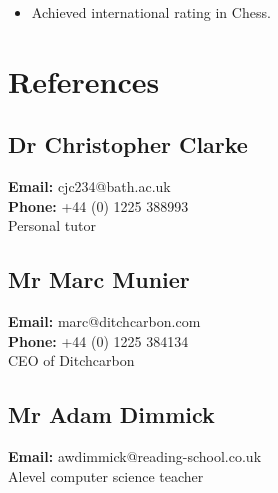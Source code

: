 \documentclass[11pt,a4paper,sans]{moderncv}        %
\begin{document}
\begin{multicols}{2}
\begin{itemize}
\vspace{5pt}

\item{Achieved international rating in Chess.}

\end{itemize}




\section{References}
\subsection{Dr Christopher Clarke}
\textbf{Email:} cjc234@bath.ac.uk \\
\textbf{Phone:} +44 (0) 1225 388993 \\
Personal tutor\\

\subsection{Mr Marc Munier} 
\textbf{Email:} marc@ditchcarbon.com\\
\textbf{Phone:} +44 (0) 1225 384134 \\
CEO of Ditchcarbon \\

\subsection{Mr Adam Dimmick} 
\textbf{Email:} awdimmick@reading-school.co.uk \\
Alevel computer science teacher \\

\nocite{*}



\end{multicols}
\end{document}
